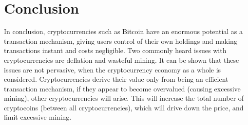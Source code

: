 
\chapter{Conclusion}

In conclusion, cryptocurrencies such as Bitcoin have an enormous potential
as a transaction mechanism, giving users control of their own holdings
and making transactions instant and costs negligible. Two commonly
heard issues with cryptocurrencies are deflation and wasteful mining.
It can be shown that these issues are not pervasive, when the cryptocurrency
economy as a whole is considered. Cryptocurrencies derive their value
only from being an efficient transaction mechanism, if they appear
to become overvalued (causing excessive mining), other cryptocurrencies
will arise. This will increase the total number of cryptocoins (between
all cryptocurrencies), which will drive down the price, and limit
excessive mining.
